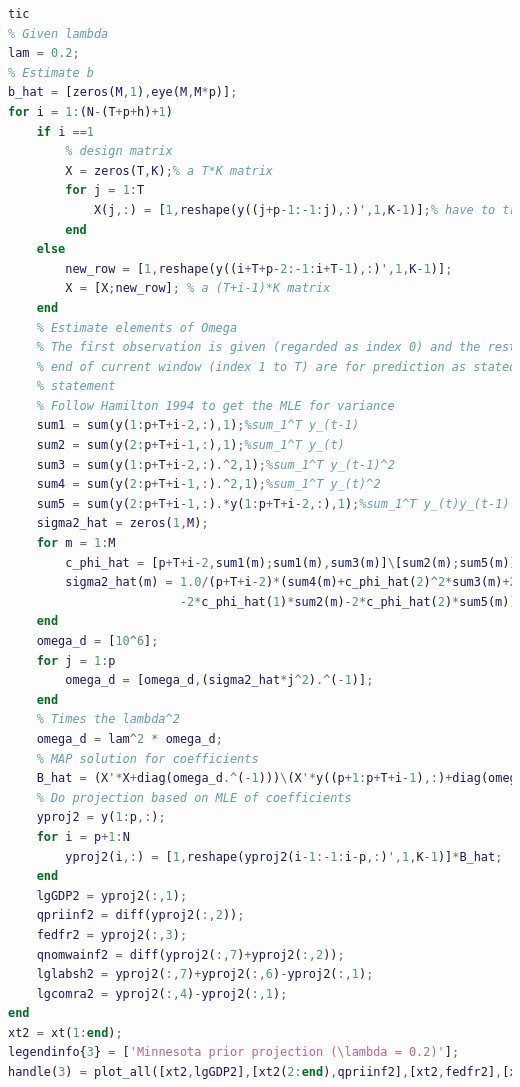 \documentclass[11pt, oneside]{article}   	%
\begin{document}
\begin{lstlisting}[language=Matlab ,caption={Matlab code for problem 2.}, label={code:prob2}]
%% (2)Minnesota prior with a given lambda
tic
% Given lambda
lam = 0.2;
% Estimate b
b_hat = [zeros(M,1),eye(M,M*p)];
for i = 1:(N-(T+p+h)+1)
    if i ==1
        % design matrix
        X = zeros(T,K);% a T*K matrix
        for j = 1:T
            X(j,:) = [1,reshape(y((j+p-1:-1:j),:)',1,K-1)];% have to transpose because the reshape function operate in column
        end
    else
        new_row = [1,reshape(y((i+T+p-2:-1:i+T-1),:)',1,K-1)];
        X = [X;new_row]; % a (T+i-1)*K matrix
    end
    % Estimate elements of Omega
    % The first observation is given (regarded as index 0) and the rest of observation up to the
    % end of current window (index 1 to T) are for prediction as stated in the problem
    % statement
    % Follow Hamilton 1994 to get the MLE for variance
    sum1 = sum(y(1:p+T+i-2,:),1);%sum_1^T y_(t-1)
    sum2 = sum(y(2:p+T+i-1,:),1);%sum_1^T y_(t)
    sum3 = sum(y(1:p+T+i-2,:).^2,1);%sum_1^T y_(t-1)^2
    sum4 = sum(y(2:p+T+i-1,:).^2,1);%sum_1^T y_(t)^2
    sum5 = sum(y(2:p+T+i-1,:).*y(1:p+T+i-2,:),1);%sum_1^T y_(t)y_(t-1)
    sigma2_hat = zeros(1,M);
    for m = 1:M
        c_phi_hat = [p+T+i-2,sum1(m);sum1(m),sum3(m)]\[sum2(m);sum5(m)];% c_phi_hat = [c_hat,phi_hat]
        sigma2_hat(m) = 1.0/(p+T+i-2)*(sum4(m)+c_phi_hat(2)^2*sum3(m)+2*c_phi_hat(1)*c_phi_hat(2)*sum1(m)...
                        -2*c_phi_hat(1)*sum2(m)-2*c_phi_hat(2)*sum5(m))+c_phi_hat(1)^2;
    end
    omega_d = [10^6];
    for j = 1:p
        omega_d = [omega_d,(sigma2_hat*j^2).^(-1)];
    end
    % Times the lambda^2
    omega_d = lam^2 * omega_d;
    % MAP solution for coefficients
    B_hat = (X'*X+diag(omega_d.^(-1)))\(X'*y((p+1:p+T+i-1),:)+diag(omega_d.^(-1))*b_hat');% a K*M matrix
    % Do projection based on MLE of coefficients
    yproj2 = y(1:p,:);
    for i = p+1:N
        yproj2(i,:) = [1,reshape(yproj2(i-1:-1:i-p,:)',1,K-1)]*B_hat; 
    end
    lgGDP2 = yproj2(:,1);
    qpriinf2 = diff(yproj2(:,2));
    fedfr2 = yproj2(:,3);
    qnomwainf2 = diff(yproj2(:,7)+yproj2(:,2));
    lglabsh2 = yproj2(:,7)+yproj2(:,6)-yproj2(:,1);
    lgcomra2 = yproj2(:,4)-yproj2(:,1);
end
xt2 = xt(1:end);
legendinfo{3} = ['Minnesota prior projection (\lambda = 0.2)'];
handle(3) = plot_all([xt2,lgGDP2],[xt2(2:end),qpriinf2],[xt2,fedfr2],[xt2(2:end),qnomwainf2],[xt2,lglabsh2],[xt2,lgcomra2],'-.g','Minnesota prior projection (\lambda = 0.2)');


\end{lstlisting}
\end{document}

